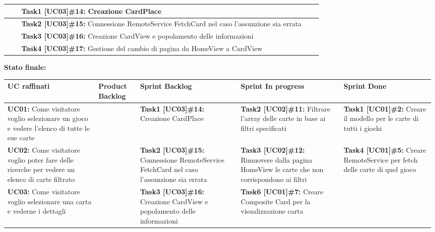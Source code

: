 \documentclass{article}
\begin{document}
\begin{itemize}
\begin{itemize}
\begin{tabular}{ | p{3.5cm} | p{1.5cm} | p{5cm} | p{1.6cm} | p{1.6cm} | }
                \hline
                & & \textbf{Task1 [UC03]\#14:} Creazione CardPlace & & \\
                \hline
                & & \textbf{Task2 [UC03]\#15:} Connessione RemoteService FetchCard nel caso l'assunzione sia errata & & \\
                \hline
                & & \textbf{Task3 [UC03]\#16:} Creazione CardView e popolamento delle informazioni & & \\
                \hline
                & & \textbf{Task4 [UC03]\#17:} Gestione del cambio di pagina da HomeView a CardView & & \\
                \hline
            \end{tabular}
            \newpage
            \textbf{Stato finale:}
            \newline
            \newline
            \begin{tabular}{ | p{2.4cm} | p{1.4cm} | p{2.7cm} | p{3.4cm} | p{3cm} | }
                \hline
                \textbf{UC raffinati}
                & \textbf{Product Backlog}
                & \textbf{Sprint Backlog}
                & \textbf{Sprint In progress}
                & \textbf{Sprint Done} \\
                \hline
                \textbf{UC01:} Come visitatore voglio selezionare un gioco e vedere l'elenco di tutte le sue carte
                & & \textbf{Task1 [UC03]\#14:} Creazione CardPlace
                & \textbf{Task2 [UC02]\#11:} Filtrare l'array delle carte in base ai filtri specificati
                & \textbf{Task1 [UC01]\#2:} Creare il modello per le carte di tutti i giochi \\
                \hline
                \textbf{UC02:} Come visitatore voglio poter fare delle ricerche per vedere un elenco di carte filtrato
                & & \textbf{Task2 [UC03]\#15:} Connessione RemoteService FetchCard nel caso l'assunzione sia errata
                & \textbf{Task3 [UC02]\#12:} Rimuovere dalla pagina HomeView le carte che non corrispondono ai filtri
                & \textbf{Task4 [UC01]\#5:} Creare RemoteService per fetch delle carte di quel gioco \\
                \hline
                \textbf{UC03:} Come visitatore voglio selezionare una carta e vederne i dettagli
                & & \textbf{Task3 [UC03]\#16:} Creazione CardView e popolamento delle informazioni
                & \textbf{Task6 [UC01]\#7:} Creare Composite Card per la visualizzazione carta

\end{tabular}
\end{itemize}
\end{itemize}
\end{document}
